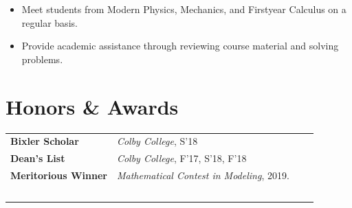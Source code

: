 \documentclass[a4paper, 10.5pt]{article}
\begin{document}
	\begin{itemize}[noitemsep, nolistsep]
		\setlength{\itemindent}{0.2in}
		\item Meet students from Modern Physics, Mechanics, and First\textendash year Calculus on a regular basis.
		\item Provide academic assistance through reviewing course material and solving problems.\\
	\end{itemize}

	\section*{\normalsize{{\color{colby}Honors \& Awards}}}
	\begin{tabular}{lp{13.5cm}lp{2in}}
		\textbf{Bixler Scholar} & \textit{Colby College}, S'18\textemdash \\
		\textbf{Dean's List} & \textit{Colby College}, F'17, S'18, F'18\\
		\textbf{Meritorious Winner} & \textit{Mathematical Contest in Modeling}, 2019. \\
		$\,$
	\end{tabular}
	
\end{document}
